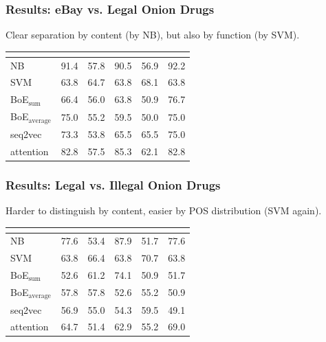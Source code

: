 \documentclass[t,xcolor={svgnames,table}]{beamer}
\begin{document}
\begin{frame}
	\frametitle{Results: eBay vs. Legal Onion Drugs}
	
	Clear separation by content (by NB), but also by function (by SVM).
	
	\begin{center}
		\setlength{\tabcolsep}{8pt}
		\begin{tabular}{l *{5}{R}}
		& 
		& 
		& 
		& 
		& \\
		\hline
		NB & 91.4 & 57.8 & 90.5 & 56.9 & 92.2\\
		SVM & 63.8 & 64.7 & 63.8 & 68.1 & 63.8\\
		BoE$_\mathrm{sum}$ & 66.4 & 56.0 & 63.8 & 50.9 & 76.7\\
		BoE$_\mathrm{average}$ & 75.0 & 55.2 & 59.5 & 50.0 & 75.0\\
		seq2vec & 73.3 & 53.8 & 65.5 & 65.5 & 75.0\\
		attention & 82.8 & 57.5 & 85.3 & 62.1 & 82.8
		\end{tabular}
	\end{center}
\end{frame}

\begin{frame}
	\frametitle{Results: Legal vs. Illegal Onion Drugs}
	
	Harder to distinguish by content, easier by POS distribution (SVM again).
	
	\begin{center}
		\setlength{\tabcolsep}{8pt}
		\begin{tabular}{l *{5}{R}}
		& 
		& 
		& 
		& 
		& \\
		\hline
		NB & 77.6 & 53.4 & 87.9 & 51.7 & 77.6\\
		SVM & 63.8 & 66.4 & 63.8 & 70.7 & 63.8\\
		BoE$_\mathrm{sum}$ & 52.6 & 61.2 & 74.1 & 50.9 & 51.7\\
		BoE$_\mathrm{average}$ & 57.8 & 57.8 & 52.6 & 55.2 & 50.9\\
		seq2vec & 56.9 & 55.0 & 54.3 & 59.5 & 49.1\\
		attention & 64.7 & 51.4 & 62.9 & 55.2 & 69.0
		\end{tabular}
	\end{center}
\end{frame}
\end{document}
